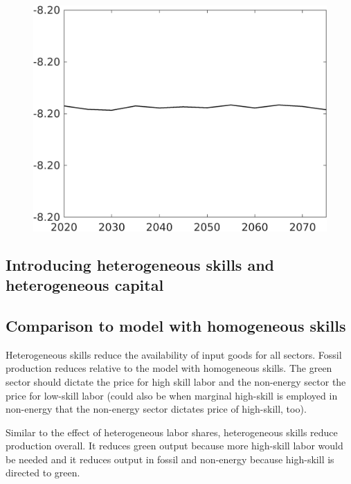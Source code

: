 \documentclass[12pt]{article}
\begin{document}
\begin{figure}[h!!]
\begin{minipage}[]{0.32\textwidth}
\end{minipage}	
\begin{minipage}[]{0.32\textwidth}
\includegraphics[width=1\textwidth]{../../codding_model/own_basedOnFried/optimalPol_010922_revision/figures/all_13Sept22/CompTaul_LFBAUPer_Reg0_Ln_spillover0_nsk1_xgr1_knspil1_sep1_countec0_GovRev0_etaa0.79.png}
\end{minipage}	
\end{figure}


\clearpage \newpage
\subsection{Introducing heterogeneous skills and heterogeneous capital}

\subsection{Comparison to model with homogeneous skills}
Heterogeneous skills reduce the availability of input goods for all sectors. Fossil production reduces relative to the model with homogeneous skills. 
The green sector should dictate the price for high skill labor and the non-energy sector the price for low-skill labor (could also be when marginal high-skill is employed in non-energy that the non-energy sector dictates price of high-skill, too). 

Similar to the effect of heterogeneous labor shares, heterogeneous skills reduce production overall. It reduces green output because more high-skill labor would be needed and it reduces output in fossil and non-energy because high-skill is directed to green. 
\end{document}
